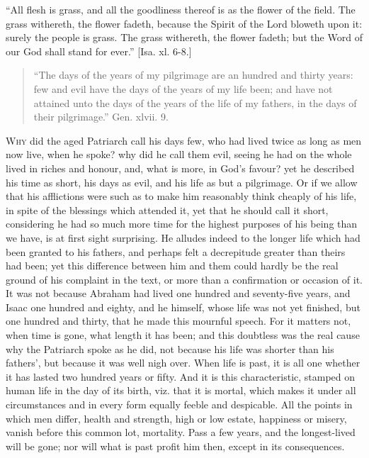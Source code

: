 ``All flesh is grass, and all the goodliness thereof is as the
flower of the field. The grass withereth, the flower fadeth, because
the Spirit of the Lord bloweth upon it: surely the people is grass.
The grass withereth, the flower fadeth; but the Word of our God shall
stand for ever.'' [Isa. xl. 6-8.]


\begin{quote}

``The days of the years of my pilgrimage are an hundred and
thirty years: few and evil have the days of the years of my life
been; and have not attained unto the days of the years of the life
of my fathers, in the days of their pilgrimage.'' Gen. xlvii. 9.

\end{quote}

W\textsc{hy} did the aged Patriarch call his days few, who had lived twice
as long as men now live, when he spoke? why did he call them evil,
seeing he had on the whole lived in riches and honour, and, what is
more, in God's favour? yet he described his time as short, his days as
evil, and his life as but a pilgrimage. Or if we allow that his
afflictions were such as to make him reasonably think cheaply of his
life, in spite of the blessings which attended it, yet that he should
call it short, considering he had so much more time for the highest
purposes of his being than we have, is at first sight surprising. He
alludes indeed to the longer life which had been granted to his
fathers, and perhaps felt a decrepitude greater than theirs had been;
yet this difference between him and them could hardly be the real
ground of his complaint in the text, or more than a confirmation or
occasion of it. It was not because Abraham had lived one hundred and
seventy-five years, and Isaac one hundred and eighty, and he himself,
whose life was not yet finished, but one hundred and thirty, that he
made this mournful speech. For it matters not, when time is gone, what
length it has been; and this doubtless was the real cause why the
Patriarch spoke as he did, not because his life was shorter than his
fathers', but because it was well nigh over. When life is past, it is
all one whether it has lasted two hundred years or fifty. And it is
this characteristic, stamped on human life in the day of its birth,
viz. that it is mortal, which makes it under all circumstances and in
every form equally feeble and despicable. All the points in which men
differ, health and strength, high or low estate, happiness or misery,
vanish before this common lot, mortality. Pass a few years, and the
longest-lived will be gone; nor will what is past profit him then,
except in its consequences.

